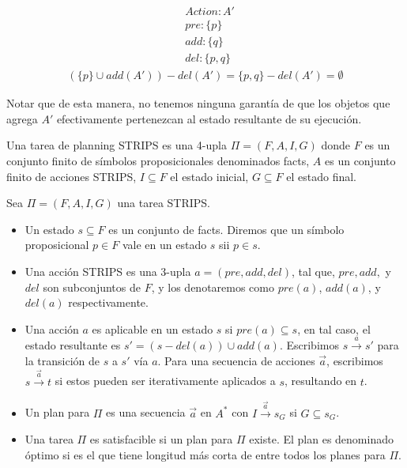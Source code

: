 \begin{align*}
    & Action : A' \\
    & pre : \{ p \}\\
    & add : \{ q \}\\
    & del : \{ p, q \}
\end{align*}
\begin{align*}
    (\{p\} \cup add(A')) - del(A') = \{p, q\} - del(A') = \emptyset
\end{align*}

Notar que de esta manera, no tenemos ninguna garantía de que los objetos que agrega $A'$ efectivamente pertenezcan
al estado resultante de su ejecución.

\begin{mydef}
    Una tarea de planning STRIPS es una 4-upla $\Pi = (F, A, I, G)$ donde $F$ es
    un conjunto finito de símbolos proposicionales denominados facts, $A$ es un
    conjunto finito de acciones STRIPS, $I \subseteq F$ el estado inicial, $G
    \subseteq F$ el estado final.
\end{mydef}

\begin{mydef}
    Sea $\Pi = (F, A, I, G)$ una tarea STRIPS.
    
    \begin{itemize}
        \item Un estado $s \subseteq F$ es un conjunto de facts. Diremos que un
        símbolo proposicional $p \in F$ vale en un estado $s$ sii $p \in s$.
        
        \item Una acción STRIPS es una 3-upla $a = (pre, add, del)$, tal que,
        $pre, add,$ y $del$ son subconjuntos de $F$, y los denotaremos como $pre(a)$,
        $add(a)$, y $del(a)$ respectivamente.

        \item Una acción $a$ es aplicable en un estado $s$ si $pre(a) \subseteq
        s$, en tal caso, el estado resultante es $s' = (s - del(a)) \cup
        add(a)$. Escribimos $s \xrightarrow{a} s'$ para la transición de $s$ a
        $s'$ vía $a$. Para una secuencia de acciones $\vec{a}$, escribimos $s
        \xrightarrow{\vec{a}} t$ si estos pueden ser iterativamente aplicados a
        $s$, resultando en $t$.

        \item Un plan para $\Pi$ es una secuencia $\vec{a}$ en $A^{*}$ con $I
        \xrightarrow{\vec{a}} s_G$ si $G \subseteq s_G$.
        
        \item Una tarea $\Pi$ es satisfacible si un plan para $\Pi$ existe. El
        plan es denominado óptimo si es el que tiene longitud más corta de entre
        todos los planes para $\Pi$.
    \end{itemize}
\end{mydef}

